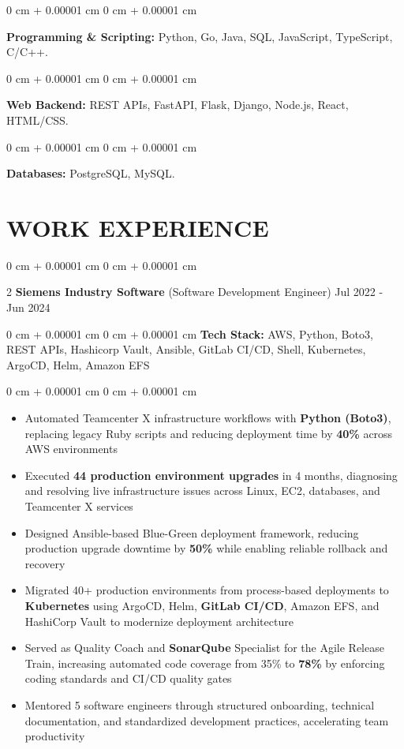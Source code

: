 \documentclass[9pt, letterpaper]{article}
\newenvironment{highlights}{
    \begin{itemize}[
        topsep=0.05 cm,
        parsep=0 pt,
        partopsep=0pt,
        itemsep=0pt,
        leftmargin=10pt
    ]
}{
    \end{itemize}
} %
\newenvironment{onecolentry}{
    \begin{adjustwidth}{
        0 cm + 0.00001 cm}{
        0 cm + 0.00001 cm}
}{
    \end{adjustwidth}
} %
\newenvironment{twocolentry}[2][]{
    \onecolentry
    \def\secondColumn{#2}
    \setcolumnwidth{\fill, 4.5 cm}
    \begin{paracol}{2}
}{
    \switchcolumn \raggedleft \secondColumn
    \end{paracol}
    \endonecolentry
} %
\begin{document}
    \begin{onecolentry}
    \textbf{Programming \& Scripting:} Python, Go, Java, SQL, JavaScript, TypeScript, C/C++.
    \end{onecolentry}

    \begin{onecolentry}
    \textbf{Web Backend:} REST APIs, FastAPI, Flask, Django, Node.js, React, HTML/CSS.
    \end{onecolentry}

    \begin{onecolentry}
    \textbf{Databases:} PostgreSQL, MySQL.
    \end{onecolentry}


\section{WORK EXPERIENCE}

    \begin{twocolentry}{Jul 2022 - Jun 2024}\textbf{Siemens Industry Software} (Software Development Engineer)\end{twocolentry}
    \begin{onecolentry}\textbf{Tech Stack:} AWS, Python, Boto3, REST APIs, Hashicorp Vault, Ansible, GitLab CI/CD, Shell, Kubernetes, ArgoCD, Helm, Amazon EFS \end{onecolentry}
    \begin{onecolentry}
        \begin{highlights}
            \item Automated Teamcenter X infrastructure workflows with \textbf{Python (Boto3)}, replacing legacy Ruby scripts and reducing deployment time by \textbf{40\%} across AWS environments
            \item Executed \textbf{44 production environment upgrades} in 4 months, diagnosing and resolving live infrastructure issues across Linux, EC2, databases, and Teamcenter X services
            \item Designed Ansible-based Blue-Green deployment framework, reducing production upgrade downtime by \textbf{50\%} while enabling reliable rollback and recovery
            \item Migrated 40+ production environments from process-based deployments to \textbf{Kubernetes} using ArgoCD, Helm, \textbf{GitLab CI/CD}, Amazon EFS, and HashiCorp Vault to modernize deployment architecture
            \item Served as Quality Coach and \textbf{SonarQube} Specialist for the Agile Release Train, increasing automated code coverage from 35\% to \textbf{78\%} by enforcing coding standards and CI/CD quality gates
            \item Mentored 5 software engineers through structured onboarding, technical documentation, and standardized development practices, accelerating team productivity
        \end{highlights}
    \end{onecolentry}
    \vspace{0.04 cm}
\end{document}
